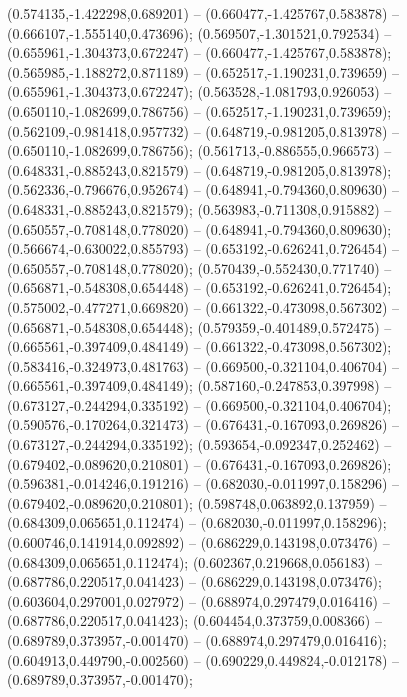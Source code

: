  (0.574135,-1.422298,0.689201) -- (0.660477,-1.425767,0.583878) -- (0.666107,-1.555140,0.473696);
 (0.569507,-1.301521,0.792534) -- (0.655961,-1.304373,0.672247) -- (0.660477,-1.425767,0.583878);
 (0.565985,-1.188272,0.871189) -- (0.652517,-1.190231,0.739659) -- (0.655961,-1.304373,0.672247);
 (0.563528,-1.081793,0.926053) -- (0.650110,-1.082699,0.786756) -- (0.652517,-1.190231,0.739659);
 (0.562109,-0.981418,0.957732) -- (0.648719,-0.981205,0.813978) -- (0.650110,-1.082699,0.786756);
 (0.561713,-0.886555,0.966573) -- (0.648331,-0.885243,0.821579) -- (0.648719,-0.981205,0.813978);
 (0.562336,-0.796676,0.952674) -- (0.648941,-0.794360,0.809630) -- (0.648331,-0.885243,0.821579);
 (0.563983,-0.711308,0.915882) -- (0.650557,-0.708148,0.778020) -- (0.648941,-0.794360,0.809630);
 (0.566674,-0.630022,0.855793) -- (0.653192,-0.626241,0.726454) -- (0.650557,-0.708148,0.778020);
 (0.570439,-0.552430,0.771740) -- (0.656871,-0.548308,0.654448) -- (0.653192,-0.626241,0.726454);
 (0.575002,-0.477271,0.669820) -- (0.661322,-0.473098,0.567302) -- (0.656871,-0.548308,0.654448);
 (0.579359,-0.401489,0.572475) -- (0.665561,-0.397409,0.484149) -- (0.661322,-0.473098,0.567302);
 (0.583416,-0.324973,0.481763) -- (0.669500,-0.321104,0.406704) -- (0.665561,-0.397409,0.484149);
 (0.587160,-0.247853,0.397998) -- (0.673127,-0.244294,0.335192) -- (0.669500,-0.321104,0.406704);
 (0.590576,-0.170264,0.321473) -- (0.676431,-0.167093,0.269826) -- (0.673127,-0.244294,0.335192);
 (0.593654,-0.092347,0.252462) -- (0.679402,-0.089620,0.210801) -- (0.676431,-0.167093,0.269826);
 (0.596381,-0.014246,0.191216) -- (0.682030,-0.011997,0.158296) -- (0.679402,-0.089620,0.210801);
 (0.598748,0.063892,0.137959) -- (0.684309,0.065651,0.112474) -- (0.682030,-0.011997,0.158296);
 (0.600746,0.141914,0.092892) -- (0.686229,0.143198,0.073476) -- (0.684309,0.065651,0.112474);
 (0.602367,0.219668,0.056183) -- (0.687786,0.220517,0.041423) -- (0.686229,0.143198,0.073476);
 (0.603604,0.297001,0.027972) -- (0.688974,0.297479,0.016416) -- (0.687786,0.220517,0.041423);
 (0.604454,0.373759,0.008366) -- (0.689789,0.373957,-0.001470) -- (0.688974,0.297479,0.016416);
 (0.604913,0.449790,-0.002560) -- (0.690229,0.449824,-0.012178) -- (0.689789,0.373957,-0.001470);
